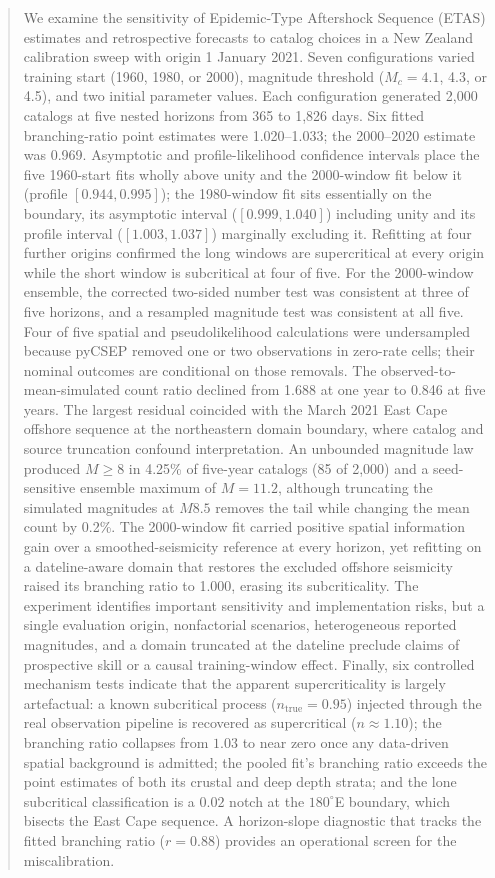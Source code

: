 \documentclass[12pt]{article}
\begin{document}
\begin{abstract}
We examine the sensitivity of Epidemic-Type Aftershock Sequence (ETAS)
estimates and retrospective forecasts to catalog choices in a New Zealand
calibration sweep with origin 1 January 2021. Seven configurations varied
training start (1960, 1980, or 2000), magnitude threshold ($M_c=4.1$, 4.3, or
4.5), and two initial parameter values. Each configuration generated 2,000
catalogs at five nested horizons from 365 to 1,826 days. Six fitted
branching-ratio point estimates were 1.020--1.033; the 2000--2020 estimate was
0.969. Asymptotic and profile-likelihood confidence intervals place the five
1960-start fits wholly above unity and the 2000-window fit below it
(profile $[0.944,0.995]$); the 1980-window fit sits essentially on the boundary,
its asymptotic interval ($[0.999,1.040]$) including unity and its profile interval
($[1.003,1.037]$) marginally excluding it. Refitting at four further
origins confirmed the long windows are supercritical at every origin while the
short window is subcritical at four of five. For the 2000-window ensemble, the corrected two-sided number test was
consistent at three of five horizons, and a resampled magnitude test was
consistent at all five. Four of five spatial and pseudolikelihood calculations
were undersampled because pyCSEP removed one or two observations in zero-rate
cells; their nominal outcomes are conditional on those removals. The
observed-to-mean-simulated count ratio declined from 1.688 at one year to 0.846
at five years. The largest residual coincided with the March 2021 East Cape
offshore sequence at the northeastern domain boundary, where catalog and
source truncation confound interpretation. An unbounded magnitude law produced
$M\geq8$ in 4.25\% of five-year catalogs (85 of 2,000) and a seed-sensitive
ensemble maximum of $M=11.2$, although truncating the simulated magnitudes at
$M8.5$ removes the tail while changing the mean count by 0.2\%. The 2000-window
fit carried positive spatial information gain over a smoothed-seismicity
reference at every horizon, yet refitting on a dateline-aware domain that
restores the excluded offshore seismicity raised its branching ratio to 1.000,
erasing its subcriticality. The experiment identifies important sensitivity and
implementation risks, but a single evaluation origin, nonfactorial scenarios,
heterogeneous reported magnitudes, and a domain truncated at the dateline
preclude claims of prospective skill or a causal training-window effect.
Finally, six controlled mechanism tests indicate that the apparent
supercriticality is largely artefactual: a known subcritical process
($n_{\mathrm{true}}=0.95$) injected through the real observation pipeline is
recovered as supercritical ($n\approx1.10$); the branching ratio collapses from
$1.03$ to near zero once any data-driven spatial background is admitted; the
pooled fit's branching ratio exceeds the point estimates of both its crustal and
deep depth strata; and the lone subcritical classification is a $0.02$ notch at the
$180^\circ$E boundary, which bisects the East Cape sequence. A horizon-slope diagnostic that tracks
the fitted branching ratio ($r=0.88$) provides an operational screen for the
miscalibration.
\end{abstract}
\end{document}
